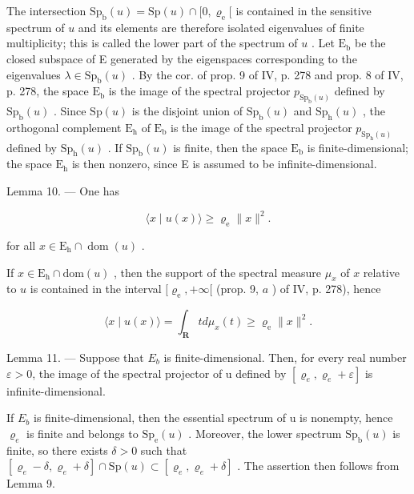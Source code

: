 The intersection \(\mathrm{Sp}_{\mathrm{b}}(u) = \mathrm{Sp}(u) \cap [0, \varrho_{\mathrm{e}}[\) is contained in the sensitive spectrum of \(u\) and its elements are therefore isolated eigenvalues of finite multiplicity; this is called the lower part of the spectrum of \(u\) . Let \(\mathrm{E}_{\mathrm{b}}\) be the closed subspace of E generated by the eigenspaces corresponding to the eigenvalues \(\lambda \in \mathrm{Sp}_{\mathrm{b}}(u)\) . By the cor. of prop. 9 of IV, p. 278 and prop. 8 of IV, p. 278, the space \(\mathrm{E}_{\mathrm{b}}\) is the image of the spectral projector \(p_{\mathrm{Sp}_{\mathrm{b}}(u)}\) defined by \(\mathrm{Sp}_{\mathrm{b}}(u)\) . Since \(\mathrm{Sp}(u)\) is the disjoint union of \(\mathrm{Sp}_{\mathrm{b}}(u)\) and \(\mathrm{Sp}_{\mathrm{h}}(u)\) , the orthogonal complement \(\mathrm{E}_{\mathrm{h}}\) of \(\mathrm{E}_{\mathrm{b}}\) is the image of the spectral projector \(p_{\mathrm{Sp}_{\mathrm{h}}(u)}\) defined by \(\mathrm{Sp}_{\mathrm{h}}(u)\) . If \(\mathrm{Sp}_{\mathrm{b}}(u)\) is finite, then the space \(\mathrm{E}_{\mathrm{b}}\) is finite-dimensional; the space \(\mathrm{E}_{\mathrm{h}}\) is then nonzero, since E is assumed to be infinite-dimensional.

Lemma 10. --- One has

\[
\langle x \mid u (x) \rangle \geqslant \varrho_ {\mathrm{e}} \| x \| ^ {2}.\tag{18}
\]

for all \(x \in \mathrm{E}_{\mathrm{h}} \cap \operatorname{dom}(u)\) .

If \(x \in \mathrm{E}_{\mathrm{h}} \cap \mathrm{dom}(u)\) , then the support of the spectral measure \(\mu_{x}\) of \(x\) relative to \(u\) is contained in the interval \([\varrho_{\mathrm{e}}, +\infty[\) (prop. 9, \(a\) ) of IV, p. 278), hence

\[
\langle x \mid u (x) \rangle = \int_ {\mathbf {R}} t d \mu_ {x} (t) \geqslant \varrho_ {\mathrm{e}} \| x \| ^ {2}.
\]

Lemma 11. --- Suppose that \(E_{b}\) is finite-dimensional. Then, for every real number \(\varepsilon > 0\), the image of the spectral projector of u defined by \([\varrho_{e}, \varrho_{e} + \varepsilon]\) is infinite-dimensional.

If \(E_{b}\) is finite-dimensional, then the essential spectrum of u is nonempty, hence \(\varrho_{e}\) is finite and belongs to \(\mathrm{Sp}_{\mathrm{e}}(u)\) . Moreover, the lower spectrum \(\mathrm{Sp}_{\mathrm{b}}(u)\) is finite, so there exists \(\delta > 0\) such that \([\varrho_{e} - \delta, \varrho_{e} + \delta] \cap \mathrm{Sp}(u) \subset [\varrho_{e}, \varrho_{e} + \delta]\) . The assertion then follows from Lemma 9.

